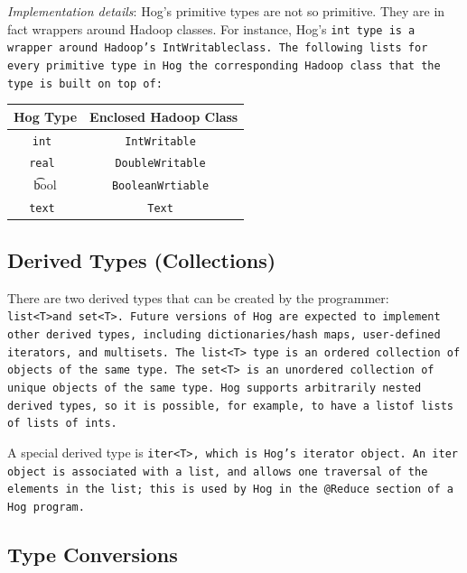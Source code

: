 \documentclass{report}
\begin{document}
\emph{Implementation details}: Hog’s primitive types are not so primitive. They are
in fact wrappers around Hadoop classes. For instance, Hog’s \tt int \rm type is a
wrapper around Hadoop's \tt IntWritableclass\rm. The following lists for every
primitive type in Hog the corresponding Hadoop class that the type is built on top
of:

\begin{center}
\begin{tabular}{|c|c|}
    \hline
\textbf{Hog Type} & \textbf{Enclosed Hadoop Class} \\ \hline
\tt int & \tt IntWritable \\ \hline
\tt real & \tt DoubleWritable \\ \hline
\t bool & \tt BooleanWrtiable \\ \hline
\tt text & \tt Text \rm \\ \hline
\end{tabular}
\end{center}


\subsection{Derived Types (Collections)} %
\label{sub:derived_types_collections_}

There are two derived types that can be created by the programmer: \tt
list<T>\rm and \tt set<T>\rm.  Future versions of Hog are expected to implement
other derived types, including dictionaries/hash maps, user-defined iterators,
and multisets. The \tt list<T> \rm type is an ordered collection of objects of
the same type. The \tt set<T> \rm is an unordered collection of unique objects
of the same type. Hog supports arbitrarily nested derived types, so it is
possible, for example, to have a \tt list\rm  of \tt list\rm s of \tt list\rm s
of \tt int\rm s.

A special derived type is \tt iter<T>\rm, which is Hog's iterator object. An
\tt iter \rm object is associated with a list, and allows one traversal of the
elements in the list; this is used by Hog in the \tt @Reduce \rm section of a
Hog program.


\subsection{Type Conversions} %
\label{sub:conversions}
\end{document}
